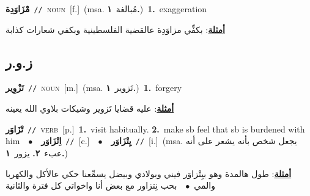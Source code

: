 \documentclass[10pt,a4paper,twoside]{article} %
\begin{document}
\begin{multicols}{2}
{\setlength\topsep{0pt}\textbf{\foreignlanguage{arabic}{مْزَاوَدِة}}\ {\color{gray}\texttt{//}\color{black}}\ \textsc{noun}\ [f.]\ \color{gray}(msa. \foreignlanguage{arabic}{مُبالغة}~\foreignlanguage{arabic}{\textbf{١.}})\color{black}\ \textbf{1.}~exaggeration\  \begin{flushright}\color{gray}\foreignlanguage{arabic}{\textbf{\underline{\foreignlanguage{arabic}{أمثلة}}}: بكفِّي مزاوَدِة عالقضية الفلسطينية وبكفي شعارات كذابة}\end{flushright}\color{black}} \vspace{2mm}

\vspace{-3mm}
\subsection*{\color{blue}\foreignlanguage{arabic}{ز.و.ر}\color{blue}{}} 

{\setlength\topsep{0pt}\textbf{\foreignlanguage{arabic}{تَزْوِير}}\ {\color{gray}\texttt{//}\color{black}}\ \textsc{noun}\ [m.]\ \color{gray}(msa. \foreignlanguage{arabic}{تَزوير}~\foreignlanguage{arabic}{\textbf{١.}})\color{black}\ \textbf{1.}~forgery\  \begin{flushright}\color{gray}\foreignlanguage{arabic}{\textbf{\underline{\foreignlanguage{arabic}{أمثلة}}}: عليه قضايا تَزوير وشيكات بلاوي الله يعينه}\end{flushright}\color{black}} \vspace{2mm}

{\setlength\topsep{0pt}\textbf{\foreignlanguage{arabic}{تْزَاوَر}}\ {\color{gray}\texttt{//}\color{black}}\ \textsc{verb}\ [p.]\ \textbf{1.}~visit habitually.  \textbf{2.}~make sb feel that sb is burdened with him\ \ $\bullet$\ \ \setlength\topsep{0pt}\textbf{\foreignlanguage{arabic}{اِتْزَاوَر}}\ {\color{gray}\texttt{//}\color{black}}\ [c.]\ \ $\bullet$\ \ \setlength\topsep{0pt}\textbf{\foreignlanguage{arabic}{يِتْزَاوَر}}\ {\color{gray}\texttt{//}\color{black}}\ [i.]\ \color{gray}(msa. \foreignlanguage{arabic}{يجعل شخص بأنه يشعر على أنه عبء}~\foreignlanguage{arabic}{\textbf{٢.}}  \foreignlanguage{arabic}{يزور}~\foreignlanguage{arabic}{\textbf{١.}})\color{black}\  \begin{flushright}\color{gray}\foreignlanguage{arabic}{\textbf{\underline{\foreignlanguage{arabic}{أمثلة}}}: طول هالمدة وهو بيِتْزاوَر فيني وبولادي وبيضل يسمِّعنا حكي عالأكل والكهربا والمي\ $\bullet$\ \  بحب نِتزاور مع بعض أنا واخواتي كل فترة والثانية}\end{flushright}\color{black}} \vspace{2mm}


\end{multicols}
\end{document}
